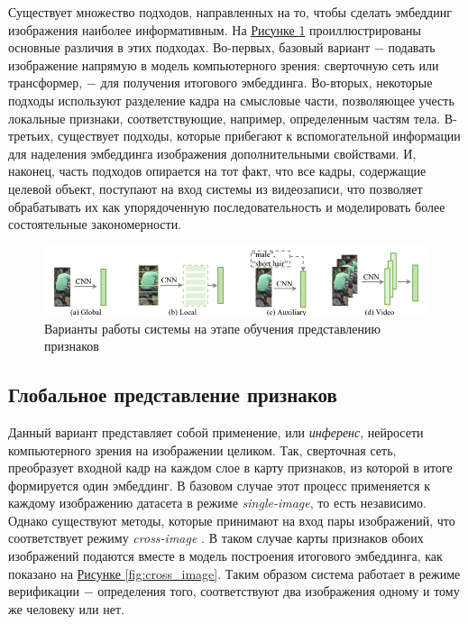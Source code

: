  Существует множество подходов, направленных на то, чтобы сделать эмбеддинг изображения наиболее информативным. На \hyperref[fig:feat_repr]{Рисунке \ref*{fig:feat_repr}} проиллюстрированы основные различия в этих подходах. Во-первых, базовый вариант $-$ подавать изображение напрямую в модель компьютерного зрения: сверточную сеть или трансформер, $-$ для получения итогового эмбеддинга. Во-вторых, некоторые подходы используют разделение кадра на смысловые части, позволяющее учесть локальные признаки, соответствующие, например, определенным частям тела. В-третьих, существует подходы, которые прибегают к вспомогательной информации для наделения эмбеддинга изображения дополнительными свойствами. И, наконец, часть подходов опирается на тот факт, что все кадры, содержащие целевой объект, поступают на вход системы из видеозаписи, что позволяет обрабатывать их как упорядоченную последовательность и моделировать более состоятельные закономерности.

 \begin{figure}[ht]
     \centering
     \includegraphics{images/closed_world/feat_repr_learning.png}
     \caption{Варианты работы системы на этапе обучения представлению признаков \cite{ye2021deep}}
     \label{fig:feat_repr}
 \end{figure}

 \subsection{Глобальное представление признаков}

 Данный вариант представляет собой применение, или \textit{инференс}, нейросети компьютерного зрения на изображении целиком. Так, сверточная сеть, преобразует входной кадр на каждом слое в карту признаков, из которой в итоге формируется один эмбеддинг. В базовом случае этот процесс применяется к каждому изображению датасета в режиме \textit{single-image}, то есть независимо. Однако существуют методы, которые принимают на вход пары изображений, что соответствует режиму \textit{cross-image} \cite{wang2016joint}. В таком случае карты признаков обоих изображений подаются вместе в модель построения итогового эмбеддинга, как показано на \hyperref[fig:cross_image]{Рисунке \ref*{fig:cross_image}}. Таким образом система работает в режиме верификации $-$ определения того, соответствуют два изображения одному и тому же человеку или нет.

